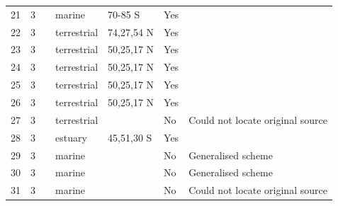 \documentclass[12pt]{article}
\begin{document}
\begin{landscape}
\begin{table}[h!]
{\begin{tabular}{p{2.8cm}p{1.3cm}p{5.5cm}p{2.2cm}p{2.5cm}lp{3.5cm}}
        21    & 3 & \cite{Patten1979}  & marine & 70-85 S & Yes   &       \\
        22    & 3 & \cite{Summerhayes1923}  & terrestrial & 74,27,54 N & Yes   &       \\
        23    & 3 & \cite{Bird1930}  & terrestrial & 50,25,17 N & Yes   &       \\
        24    & 3 & \cite{Bird1930}  & terrestrial & 50,25,17 N & Yes   &       \\
        25    & 3 & \cite{Bird1930}  & terrestrial & 50,25,17 N & Yes   &       \\
        26    & 3 & \cite{Bird1930}  & terrestrial & 50,25,17 N & Yes   &       \\
        27    & 3 & \cite{Varley1970}  & terrestrial &       & No    & Could not locate original source \\
        28    & 3 & \cite{Paviour-Smith1956}  & estuary & 45,51,30 S & Yes   &       \\
        29    & 3 & \cite{Dunbar1953}  & marine &       & No    & Generalised scheme \\
        30    & 3 & \cite{Mackintosh1964}  & marine &       & No    & Generalised scheme \\
        31    & 3 & \cite{Petipa1970}  & marine &       & No    & Could not locate original source \\
      \hline
      \end{tabular}}%
      \end{table}

        \newpage


\end{landscape}
\end{document}

